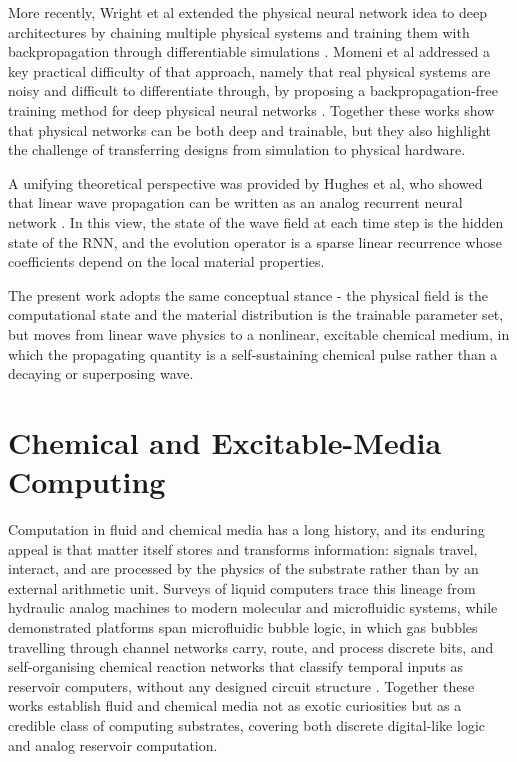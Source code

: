 More recently, Wright et al extended the physical neural network idea to deep architectures by chaining multiple physical systems and training them with backpropagation through differentiable simulations \cite{wright2022deep}. Momeni et al addressed a key practical difficulty of that approach, namely that real physical systems are noisy and difficult to differentiate through, by proposing a backpropagation-free training method for deep physical neural networks \cite{momeni2023backpropagation}. Together these works show that physical networks can be both deep and trainable, but they also highlight the challenge of transferring designs from simulation to physical hardware.

A unifying theoretical perspective was provided by Hughes et al, who showed that linear wave propagation can be written as an analog recurrent neural network \cite{hughes2019wave}. In this view, the state of the wave field at each time step is the hidden state of the RNN, and the evolution operator is a sparse linear recurrence whose coefficients depend on the local material properties.

The present work adopts the same conceptual stance - the physical field is the computational state and the material distribution is the trainable parameter set, but moves from linear wave physics to a nonlinear, excitable chemical medium, in which the propagating quantity is a self-sustaining chemical pulse rather than a decaying or superposing wave.


\section{Chemical and Excitable-Media Computing}
\label{sec:lit_chemical}

Computation in fluid and chemical media has a long history, and its enduring appeal is that matter itself stores and transforms information: signals travel, interact, and are processed by the physics of the substrate rather than by an external arithmetic unit. 
Surveys of liquid computers trace this lineage from hydraulic analog machines to modern molecular and microfluidic systems, while demonstrated platforms span microfluidic bubble logic, in which gas bubbles travelling through channel networks carry, route, and process discrete bits, and self-organising chemical reaction networks that classify temporal inputs as reservoir computers, without any designed circuit structure \cite{adamatzky2019liquid, prakash2007bubble, baltussen2024chemical}. 
Together these works establish fluid and chemical media not as exotic curiosities but as a credible class of computing substrates, covering both discrete digital-like logic and analog reservoir computation.

